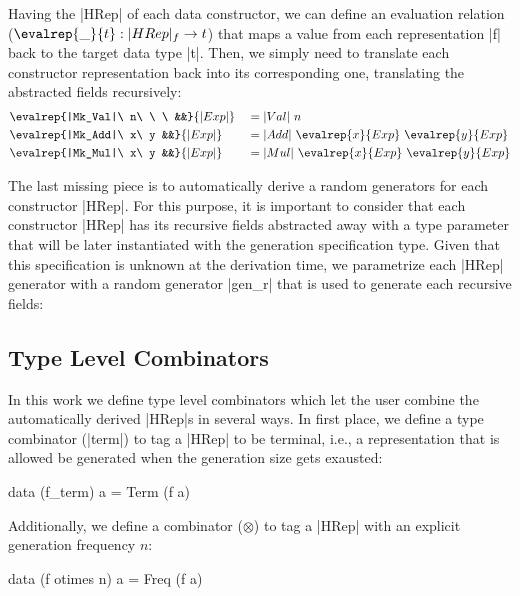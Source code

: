Having the |HRep| of each data constructor, we can define an evaluation relation
($\evalrep{\_}{t} : |HRep|_f \rightarrow t$) that maps a value from each
representation |f| back to the target data type |t|.
%
Then, we simply need to translate each constructor representation back into its
corresponding one, translating the abstracted fields recursively:
%
\begin{alignat*}{4}
  &\evalrep{|Mk_Val|\ n\ \ \ &&}{|Exp|}
    &&= |Val|\ n \\
  &\evalrep{|Mk_Add|\ x\ y   &&}{|Exp|}
    &&= |Add|\ \evalrep{x}{Exp}\ \evalrep{y}{Exp} \\
  &\evalrep{|Mk_Mul|\ x\ y   &&}{|Exp|}
    &&= |Mul|\ \evalrep{x}{Exp}\ \evalrep{y}{Exp}
\end{alignat*}

The last missing piece is to automatically derive a random generators for each
constructor |HRep|.
%
For this purpose, it is important to consider that each constructor |HRep| has
its recursive fields abstracted away with a type parameter that will be later
instantiated with the generation specification type.
%
Given that this specification is unknown at the derivation time, we parametrize
each |HRep| generator with a random generator |gen_r| that is used to generate
each recursive fields:



\subsection*{\textbf{Type Level Combinators}}

In this work we define type level combinators which let the user combine the
automatically derived |HRep|s in several ways.
%
In first place, we define a type combinator (|term|) to tag a |HRep| to be
terminal, i.e., a representation that is allowed be generated when the
generation size gets exausted:
%
\begin{code}
data (f_term) a = Term (f a)
\end{code}

Additionally, we define a combinator ($\otimes$) to tag a |HRep| with an
explicit generation frequency $n$:

\begin{code}
data (f otimes n) a = Freq (f a)
\end{code}

